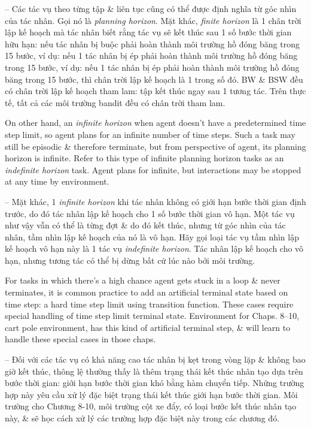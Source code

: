 \documentclass{article}
\begin{document}
\begin{itemize}
\begin{itemize}
        -- Các tác vụ theo từng tập \& liên tục cũng có thể được định nghĩa từ góc nhìn của tác nhân. Gọi nó là {\it planning horizon}. Mặt khác, {\it finite horizon} là 1 chân trời lập kế hoạch mà tác nhân biết rằng tác vụ sẽ kết thúc sau 1 số bước thời gian hữu hạn: nếu tác nhân bị buộc phải hoàn thành môi trường hồ đóng băng trong 15 bước, ví dụ: nếu 1 tác nhân bị ép phải hoàn thành môi trường hồ đóng băng trong 15 bước, ví dụ: nếu 1 tác nhân bị ép phải hoàn thành môi trường hồ đóng băng trong 15 bước, thì chân trời lập kế hoạch là 1 trong số đó. BW \& BSW đều có chân trời lập kế hoạch tham lam: tập kết thúc ngay sau 1 tương tác. Trên thực tế, tất cả các môi trường bandit đều có chân trời tham lam.

        On other hand, an {\it infinite horizon} when agent doesn't have a predetermined time step limit, so agent plans for an infinite number of time steps. Such a task may still be episodic \& therefore terminate, but from perspective of agent, its planning horizon is infinite. Refer to this type of infinite planning horizon tasks as an {\it indefinite horizon} task. Agent plans for infinite, but interactions may be stopped at any time by environment.

        -- Mặt khác, 1 {\it infinite horizon} khi tác nhân không có giới hạn bước thời gian định trước, do đó tác nhân lập kế hoạch cho 1 số bước thời gian vô hạn. Một tác vụ như vậy vẫn có thể là từng đợt \& do đó kết thúc, nhưng từ góc nhìn của tác nhân, tầm nhìn lập kế hoạch của nó là vô hạn. Hãy gọi loại tác vụ tầm nhìn lập kế hoạch vô hạn này là 1 tác vụ {\it indefinite horizon}. Tác nhân lập kế hoạch cho vô hạn, nhưng tương tác có thể bị dừng bất cứ lúc nào bởi môi trường.

        For tasks in which there's a high chance agent gets stuck in a loop \& never terminates, it is common practice to add an artificial terminal state based on time step: a hard time step limit using transition function. These cases require special handling of time step limit terminal state. Environment for Chaps. 8--10, cart pole environment, has this kind of artificial terminal step, \& will learn to handle these special cases in those chaps.

        -- Đối với các tác vụ có khả năng cao tác nhân bị kẹt trong vòng lặp \& không bao giờ kết thúc, thông lệ thường thấy là thêm trạng thái kết thúc nhân tạo dựa trên bước thời gian: giới hạn bước thời gian khó bằng hàm chuyển tiếp. Những trường hợp này yêu cầu xử lý đặc biệt trạng thái kết thúc giới hạn bước thời gian. Môi trường cho Chương 8-10, môi trường cột xe đẩy, có loại bước kết thúc nhân tạo này, \& sẽ học cách xử lý các trường hợp đặc biệt này trong các chương đó.


\end{itemize}
\end{itemize}
\end{document}
